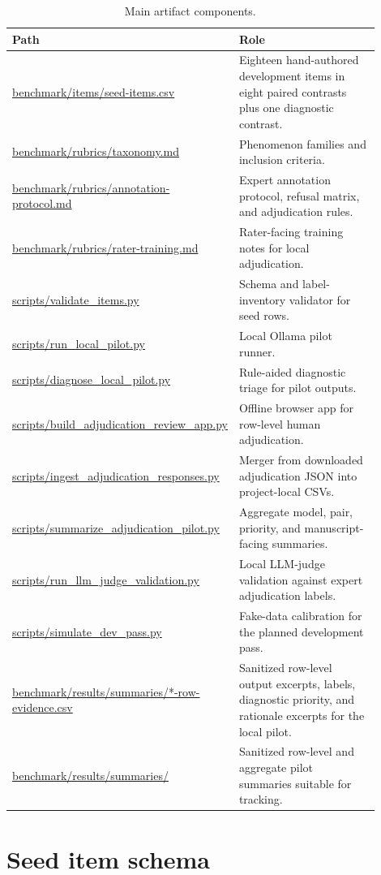 \documentclass[12pt]{article}
\begin{document}
\begin{longtable}{L{0.36\linewidth}L{0.54\linewidth}}
\caption{Main artifact components.}\\
\toprule
Path & Role \\
\midrule
\url{benchmark/items/seed-items.csv} & Eighteen hand-authored development items in eight paired contrasts plus one diagnostic contrast. \\
\url{benchmark/rubrics/taxonomy.md} & Phenomenon families and inclusion criteria. \\
\url{benchmark/rubrics/annotation-protocol.md} & Expert annotation protocol, refusal matrix, and adjudication rules. \\
\url{benchmark/rubrics/rater-training.md} & Rater-facing training notes for local adjudication. \\
\url{scripts/validate_items.py} & Schema and label-inventory validator for seed rows. \\
\url{scripts/run_local_pilot.py} & Local Ollama pilot runner. \\
\url{scripts/diagnose_local_pilot.py} & Rule-aided diagnostic triage for pilot outputs. \\
\url{scripts/build_adjudication_review_app.py} & Offline browser app for row-level human adjudication. \\
\url{scripts/ingest_adjudication_responses.py} & Merger from downloaded adjudication JSON into project-local CSVs. \\
\url{scripts/summarize_adjudication_pilot.py} & Aggregate model, pair, priority, and manuscript-facing summaries. \\
\url{scripts/run_llm_judge_validation.py} & Local LLM-judge validation against expert adjudication labels. \\
\url{scripts/simulate_dev_pass.py} & Fake-data calibration for the planned development pass. \\
\url{benchmark/results/summaries/*-row-evidence.csv} & Sanitized row-level output excerpts, labels, diagnostic priority, and rationale excerpts for the local pilot. \\
\url{benchmark/results/summaries/} & Sanitized row-level and aggregate pilot summaries suitable for tracking. \\
\bottomrule
\end{longtable}

\section{Seed item schema}
\end{document}
